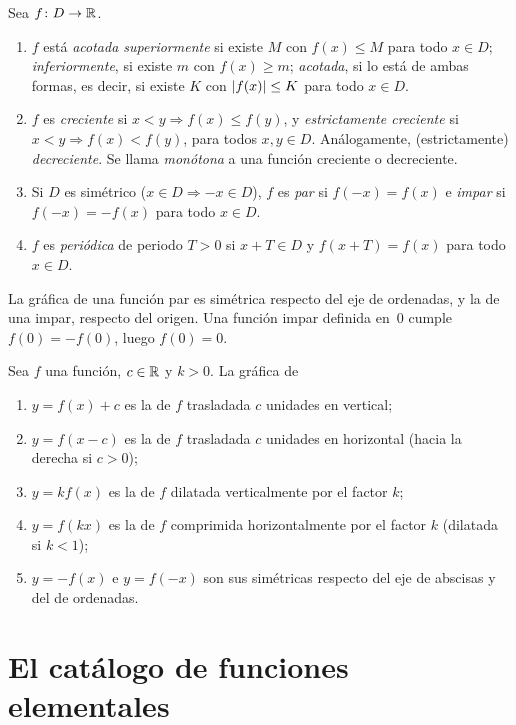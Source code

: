 \begin{definicion}\label{def:propiedades}
Sea $f\colon D\to\mathbb{R}$.
\begin{enumerate}
  \item $f$ está \emph{acotada superiormente} si existe $M$ con $f(x)\le M$ para todo $x\in D$; \emph{inferiormente}, si existe $m$ con $f(x)\ge m$; \emph{acotada}, si lo está de ambas formas, es decir, si existe $K$ con $\lvert f(x)\rvert\le K$ para todo $x\in D$.
  \item $f$ es \emph{creciente} si $x<y\Rightarrow f(x)\le f(y)$, y \emph{estrictamente creciente} si $x<y\Rightarrow f(x)<f(y)$, para todos $x,y\in D$. Análogamente, (estrictamente) \emph{decreciente}. Se llama \emph{monótona} a una función creciente o decreciente.
  \item Si $D$ es simétrico ($x\in D\Rightarrow -x\in D$), $f$ es \emph{par} si $f(-x)=f(x)$ e \emph{impar} si $f(-x)=-f(x)$ para todo $x\in D$.
  \item $f$ es \emph{periódica} de periodo $T>0$ si $x+T\in D$ y $f(x+T)=f(x)$ para todo $x\in D$.
\end{enumerate}
\end{definicion}

La gráfica de una función par es simétrica respecto del eje de ordenadas, y la de una impar, respecto del origen. Una función impar definida en~$0$ cumple $f(0)=-f(0)$, luego $f(0)=0$.

\begin{proposicion}\label{prop:transformaciones}
Sea $f$ una función, $c\in\mathbb{R}$ y $k>0$. La gráfica de
\begin{enumerate}
  \item $y=f(x)+c$ es la de $f$ trasladada $c$ unidades en vertical;
  \item $y=f(x-c)$ es la de $f$ trasladada $c$ unidades en horizontal (hacia la derecha si $c>0$);
  \item $y=kf(x)$ es la de $f$ dilatada verticalmente por el factor $k$;
  \item $y=f(kx)$ es la de $f$ comprimida horizontalmente por el factor $k$ (dilatada si $k<1$);
  \item $y=-f(x)$ e $y=f(-x)$ son sus simétricas respecto del eje de abscisas y del de ordenadas.
\end{enumerate}
\end{proposicion}

\section{El catálogo de funciones elementales}

